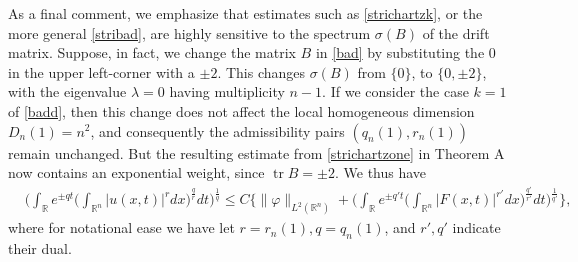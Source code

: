 \documentclass[11pt,letter]{amsart}
\def \R {\mathbb{R}}
\def \vf{\varphi}
\newcommand{\Rn}{\mathbb R^n}
\newcommand{\la}{\lambda}
\numberwithin{equation}{section}
\newcommand{\tr}{\operatorname{tr}}
\numberwithin{equation}{section}
\begin{document}
\noindent As a final comment, we emphasize that estimates such as \eqref{strichartzk}, or the more general \eqref{stribad}, are highly sensitive to the spectrum 
$\sigma(B)$ of the drift matrix. Suppose, in fact, we change the matrix $B$ in \eqref{bad} by substituting the $0$ in the upper left-corner with a $\pm 2$. This changes $\sigma(B)$ from $\{0\}$, to $\{0,\pm 2\}$, with the eigenvalue $\la = 0$ having multiplicity $n-1$. If we consider the case $k=1$ of \eqref{badd}, then this change does not affect the local homogeneous dimension $D_n(1) = n^2$, and consequently the admissibility pairs $(q_n(1),r_n(1))$ remain unchanged. But the resulting estimate from \eqref{strichartzone} in Theorem A now contains an exponential weight, since $\tr B = \pm 2$. We thus have 
\begin{align}\label{strichartz2}
& \bigg(\int_\R e^{\pm q t} \big(\int_{\Rn}|u(x,t)|^r dx\big)^{\frac qr} dt\bigg)^{\frac 1q} \le C \bigg\{\|\vf\|_{L^2(\Rn)}
 + \bigg(\int_\R e^{\pm q' t} \big(\int_{\Rn}|F(x,t)|^{r'} dx\big)^{\frac{q'}{r'}} dt\bigg)^{\frac 1{q'}}\bigg\},
\end{align}
where for notational ease we have let $r = r_n(1), q = q_n(1)$, and $r', q'$ indicate their dual.














\vskip 0.2in
	

\end{document}
